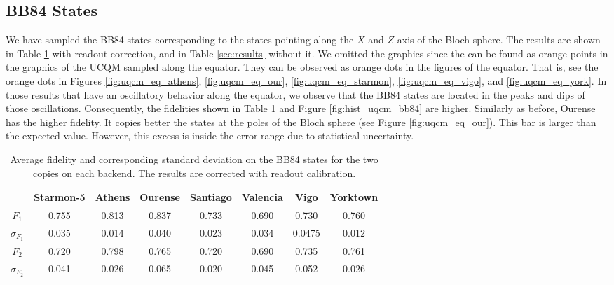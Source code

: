 \subsection{BB84 States}

We have sampled the BB84 states corresponding to the states pointing along the $X$ and $Z$ axis of the Bloch sphere. The results are shown in Table \ref{tab:uqcm_results_bb} with readout correction, and in Table \ref{sec:results} without it. We omitted the graphics since the can be found as orange points in the graphics of the UCQM sampled along the equator. They can be observed as orange dots in the figures of the equator. That is, see the orange dots in Figures \ref{fig:uqcm_eq_athens}, \ref{fig:uqcm_eq_our}, \ref{fig:uqcm_eq_starmon}, \ref{fig:uqcm_eq_vigo}, and \ref{fig:uqcm_eq_york}. In those results that have an oscillatory behavior along the equator, we observe that the BB84 states are located in the peaks and dips of those oscillations. Consequently, the fidelities shown in Table \ref{tab:uqcm_results_bb} and Figure \ref{fig:hist_uqcm_bb84} are higher. Similarly as before, Ourense has the higher fidelity. It copies better the states at the poles of the Bloch sphere (see Figure \ref{fig:uqcm_eq_our}). This bar is larger than the expected value. However, this excess is inside the error range due to statistical uncertainty.

\begin{table}[H]
    \centering
    \begin{tabular}{|c|c|c|c|c|c|c|c|}
    \hline
    \textbf{} & \textbf{Starmon-5} & \textbf{Athens} & \textbf{Ourense} & \textbf{Santiago} & \textbf{Valencia} & \textbf{Vigo} & \textbf{Yorktown} \\ \hline
    $F_1$              & 0.755 & 0.813 & 0.837 & 0.733 & 0.690 & 0.730 & 0.760\\ \hline
    $\sigma_{F_1}$     & 0.035 & 0.014 & 0.040 & 0.023 & 0.034 & 0.0475 & 0.012 \\ \hline
    $F_2$              & 0.720 & 0.798 & 0.765 & 0.720 & 0.690 & 0.735 & 0.761 \\ \hline
    $\sigma_{F_2}$     & 0.041 & 0.026 & 0.065 & 0.020 & 0.045 & 0.052 & 0.026 \\ \hline
    \end{tabular}
    \caption{Average fidelity and corresponding standard deviation on the BB84 states for the two copies on each backend. The results are corrected with readout calibration.}\label{tab:uqcm_results_bb}
\end{table}

